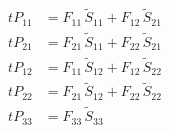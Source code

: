 \begin{align}
tP_{11} &= F_{11}\,\tilde{S}_{11}+F_{12}\,\tilde{S}_{21} \\ 
tP_{21} &= F_{21}\,\tilde{S}_{11}+F_{22}\,\tilde{S}_{21} \\ 
tP_{12} &= F_{11}\,\tilde{S}_{12}+F_{12}\,\tilde{S}_{22} \\ 
tP_{22} &= F_{21}\,\tilde{S}_{12}+F_{22}\,\tilde{S}_{22} \\ 
tP_{33} &= F_{33}\,\tilde{S}_{33} 
\end{align}
